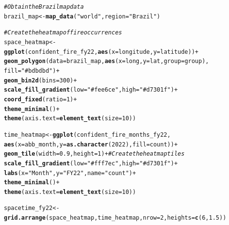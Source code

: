 \documentclass{article}\usepackage[]{graphicx}\usepackage[]{xcolor}
\makeatletter
\newcommand{\hlnum}[1]{\textcolor[rgb]{0.686,0.059,0.569}{#1}}%
\newcommand{\hlstr}[1]{\textcolor[rgb]{0.192,0.494,0.8}{#1}}%
\newcommand{\hlcom}[1]{\textcolor[rgb]{0.678,0.584,0.686}{\textit{#1}}}%
\newcommand{\hlopt}[1]{\textcolor[rgb]{0,0,0}{#1}}%
\newcommand{\hlstd}[1]{\textcolor[rgb]{0.345,0.345,0.345}{#1}}%
\newcommand{\hlkwb}[1]{\textcolor[rgb]{0.69,0.353,0.396}{#1}}%
\newcommand{\hlkwc}[1]{\textcolor[rgb]{0.333,0.667,0.333}{#1}}%
\newcommand{\hlkwd}[1]{\textcolor[rgb]{0.737,0.353,0.396}{\textbf{#1}}}%
\newenvironment{kframe}{%
 \def\at@end@of@kframe{}%
 \ifinner\ifhmode%
  \def\at@end@of@kframe{\end{minipage}}%
  \begin{minipage}{\columnwidth}%
 \fi\fi%
 \def\FrameCommand##1{\hskip\@totalleftmargin \hskip-\fboxsep
 \colorbox{shadecolor}{##1}\hskip-\fboxsep
     \hskip-\linewidth \hskip-\@totalleftmargin \hskip\columnwidth}%
 \MakeFramed {\advance\hsize-\width
   \@totalleftmargin\z@ \linewidth\hsize
   \@setminipage}}%
 {\par\unskip\endMakeFramed%
 \at@end@of@kframe}
\newenvironment{knitrout}{}{} %
\makeatother
\begin{document}
\begin{knitrout}
\color{fgcolor}\begin{kframe}
\begin{alltt}
\hlcom{# Obtain the Brazil map data}
\hlstd{brazil_map} \hlkwb{<-} \hlkwd{map_data}\hlstd{(}\hlstr{"world"}\hlstd{,} \hlkwc{region} \hlstd{=} \hlstr{"Brazil"}\hlstd{)}

\hlcom{# Create the heatmap of fire occurrences}
\hlstd{space_heatmap} \hlkwb{<-} \hlkwd{ggplot}\hlstd{(confident_fire_fy22,} \hlkwd{aes}\hlstd{(}\hlkwc{x} \hlstd{= longitude,} \hlkwc{y} \hlstd{= latitude))} \hlopt{+}
  \hlkwd{geom_polygon}\hlstd{(}\hlkwc{data} \hlstd{= brazil_map,} \hlkwd{aes}\hlstd{(}\hlkwc{x} \hlstd{= long,} \hlkwc{y} \hlstd{= lat,} \hlkwc{group} \hlstd{= group),}
               \hlkwc{fill} \hlstd{=} \hlstr{"#bdbdbd"}\hlstd{)} \hlopt{+}
  \hlkwd{geom_bin2d}\hlstd{(}\hlkwc{bins} \hlstd{=} \hlnum{300}\hlstd{)} \hlopt{+}
  \hlkwd{scale_fill_gradient}\hlstd{(}\hlkwc{low} \hlstd{=} \hlstr{"#fee6ce"}\hlstd{,} \hlkwc{high} \hlstd{=} \hlstr{"#d7301f"}\hlstd{)} \hlopt{+}
  \hlkwd{coord_fixed}\hlstd{(}\hlkwc{ratio} \hlstd{=} \hlnum{1}\hlstd{)} \hlopt{+}
  \hlkwd{theme_minimal}\hlstd{()}\hlopt{+}
  \hlkwd{theme}\hlstd{(}\hlkwc{axis.text} \hlstd{=} \hlkwd{element_text}\hlstd{(}\hlkwc{size} \hlstd{=} \hlnum{10}\hlstd{))}

\hlstd{time_heatmap} \hlkwb{<-} \hlkwd{ggplot}\hlstd{(confident_fire_months_fy22,}
                       \hlkwd{aes}\hlstd{(}\hlkwc{x} \hlstd{= abb_month,} \hlkwc{y} \hlstd{=} \hlkwd{as.character}\hlstd{(}\hlnum{2022}\hlstd{),} \hlkwc{fill} \hlstd{= count))} \hlopt{+}
  \hlkwd{geom_tile}\hlstd{(}\hlkwc{width} \hlstd{=} \hlnum{0.9}\hlstd{,} \hlkwc{height} \hlstd{=} \hlnum{1}\hlstd{)} \hlopt{+}  \hlcom{# Create the heatmap tiles}
  \hlkwd{scale_fill_gradient}\hlstd{(}\hlkwc{low} \hlstd{=} \hlstr{"#fff7ec"}\hlstd{,} \hlkwc{high} \hlstd{=} \hlstr{"#d7301f"}\hlstd{)} \hlopt{+}
  \hlkwd{labs}\hlstd{(}\hlkwc{x} \hlstd{=} \hlstr{"Month"}\hlstd{,} \hlkwc{y} \hlstd{=} \hlstr{"FY22"}\hlstd{,} \hlkwc{name} \hlstd{=} \hlstr{"count"}\hlstd{)} \hlopt{+}
  \hlkwd{theme_minimal}\hlstd{()} \hlopt{+}
  \hlkwd{theme}\hlstd{(}\hlkwc{axis.text} \hlstd{=} \hlkwd{element_text}\hlstd{(}\hlkwc{size} \hlstd{=} \hlnum{10}\hlstd{))}

\hlstd{spacetime_fy22} \hlkwb{<-} \hlkwd{grid.arrange}\hlstd{(space_heatmap, time_heatmap,} \hlkwc{nrow} \hlstd{=} \hlnum{2}\hlstd{,} \hlkwc{heights} \hlstd{=} \hlkwd{c}\hlstd{(}\hlnum{6}\hlstd{,}\hlnum{1.5}\hlstd{))}


\end{alltt}
\end{kframe}
\end{knitrout}
\end{document}

